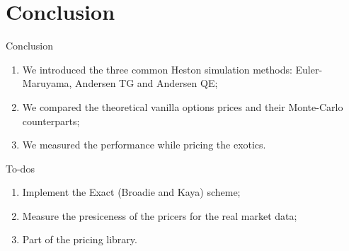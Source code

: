 \documentclass[aspectratio=169]{beamer}
\begin{document}
    \section{Conclusion}
        \begin{frame}{Conclusion}
            \begin{enumerate}
                \item We introduced the three common Heston simulation methods: Euler-Maruyama, Andersen TG and Andersen QE; 
                \item We compared the theoretical vanilla options prices and their Monte-Carlo counterparts;
                \item We measured the performance while pricing the exotics.
            \end{enumerate}
        \end{frame}
        \begin{frame}{To-dos}
            \begin{enumerate}
                \item Implement the Exact (Broadie and Kaya) scheme;
                \item Measure the presiceness of the pricers for the real market data;
                \item Part of the pricing library.
            \end{enumerate}
        \end{frame}
\end{document}
